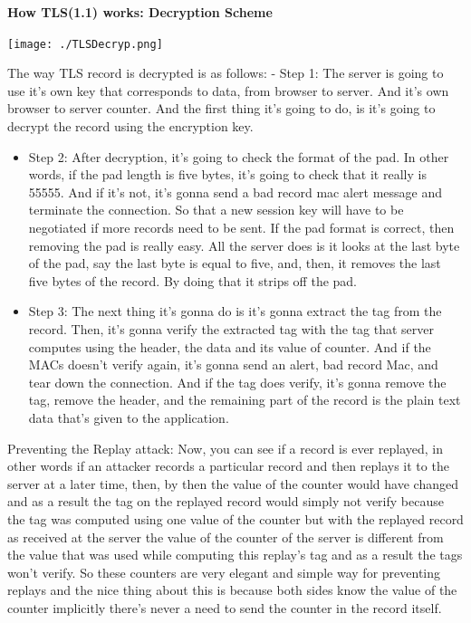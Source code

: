 \documentclass[11pt]{article}
\begin{document}
\textbf{How TLS(1.1) works: Decryption Scheme}

\texttt{[image: ./TLSDecryp.png]}

The way TLS record is decrypted is as follows: - Step 1: The server is
going to use it's own key that corresponds to data, from browser to
server. And it's own browser to server counter. And the first thing it's
going to do, is it's going to decrypt the record using the encryption
key.

\begin{itemize}
\item
  Step 2: After decryption, it's going to check the format of the pad.
  In other words, if the pad length is five bytes, it's going to check
  that it really is 55555. And if it's not, it's gonna send a bad record
  mac alert message and terminate the connection. So that a new session
  key will have to be negotiated if more records need to be sent. If the
  pad format is correct, then removing the pad is really easy. All the
  server does is it looks at the last byte of the pad, say the last byte
  is equal to five, and, then, it removes the last five bytes of the
  record. By doing that it strips off the pad. 
\item
  Step 3: The next thing it's gonna do is it's gonna extract the tag
  from the record. Then, it's gonna verify the extracted tag with the
  tag that server computes using the header, the data and its value of
  counter. And if the MACs doesn't verify again, it's gonna send an
  alert, bad record Mac, and tear down the connection. And if the tag
  does verify, it's gonna remove the tag, remove the header, and the
  remaining part of the record is the plain text data that's given to
  the application.
\end{itemize}

Preventing the Replay attack: Now, you can see if a record is ever
replayed, in other words if an attacker records a particular record and
then replays it to the server at a later time, then, by then the value
of the counter would have changed and as a result the tag on the
replayed record would simply not verify because the tag was computed
using one value of the counter but with the replayed record as received
at the server the value of the counter of the server is different from
the value that was used while computing this replay's tag and as a
result the tags won't verify. So these counters are very elegant and
simple way for preventing replays and the nice thing about this is
because both sides know the value of the counter implicitly there's
never a need to send the counter in the record itself.
\end{document}
